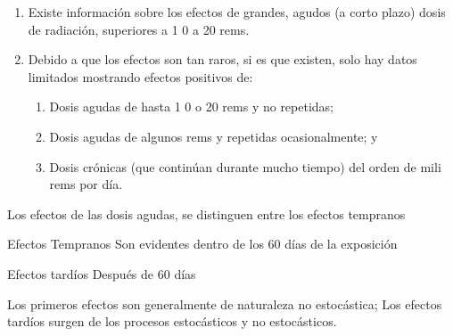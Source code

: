 \documentclass{beamer}
\begin{document}

\begin{frame}
    
    \begin{enumerate}
    	\item Existe información sobre los efectos de grandes, agudos (a corto plazo)	dosis de radiación, superiores a 1 0 a 20 rems.
    	\item Debido a que los efectos son tan raros, si es que existen, solo hay datos limitados
    	mostrando efectos positivos de:	
    	\begin{enumerate}
    		\item Dosis agudas de hasta 1 0 o 20 rems y no repetidas;
    		\item Dosis agudas de algunos rems y repetidas ocasionalmente; y
    		\item Dosis crónicas (que continúan durante mucho tiempo) del orden de mili rems por día.
    	\end{enumerate}	
    \end{enumerate}	
\end{frame}




\begin{frame}
	Los efectos de las dosis agudas, se distinguen entre los efectos tempranos
	
	\begin{block}{Efectos Tempranos}
		Son evidentes dentro de los 60 días de la exposición
	\end{block}

    \begin{block}{Efectos tardíos}
    	Después de 60 días
    \end{block}
  
  Los primeros efectos son generalmente de naturaleza no estocástica; Los efectos tardíos surgen de los procesos estocásticos y no estocásticos. 

\end{frame}

\end{document}
